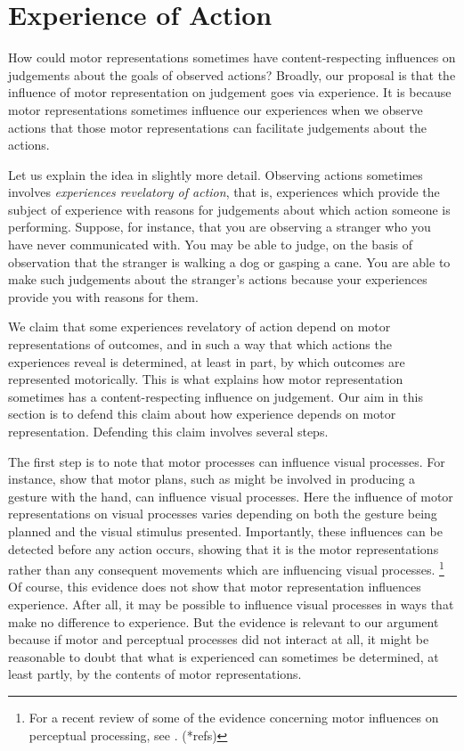 \documentclass[12pt,\papersize]{extarticle}
\begin{document}
\section{Experience of Action}
\label{sec:processes}
How could motor representations sometimes have content-respecting influences on judgements about the goals of observed actions?  Broadly, our proposal is that the influence of motor representation on judgement goes via experience.  It is because motor representations sometimes influence our experiences when we observe actions that those motor representations can facilitate judgements about the actions. 

Let us explain the idea in slightly more detail.  Observing actions sometimes involves \emph{experiences revelatory of action}, that is, experiences which provide the subject of experience with reasons for judgements about which action someone is performing. Suppose, for instance, that you are observing a stranger who you have never communicated with.  You may be able to judge, on the basis of observation that the stranger is walking a dog or gasping a cane.  You are able to make such judgements about the stranger's actions because your experiences provide you with reasons for them.

We claim that some experiences revelatory of action depend on motor representations of outcomes, and in such a way that which actions the experiences reveal is determined, at least in part, by which outcomes are represented motorically. This is what explains how motor representation sometimes has a content-respecting influence on judgement.  Our aim in  this section is to defend this claim about how experience depends on motor representation.  Defending this claim involves several steps.  

The first step is to note that motor processes can influence visual processes.  For instance, \citet{bortoletto:2011_action} show that motor plans, such as might be involved in producing a gesture with the hand, can influence visual processes. Here the influence of motor representations on visual processes varies depending on both the gesture being planned and the visual stimulus presented. Importantly, these influences can be detected before any action occurs, showing that it is the motor representations rather than any consequent movements which are influencing visual processes.%
\footnote{
For a recent review of some of the evidence concerning motor influences on perceptual processing, see \citet{halasz:2012_unconscious}. (*refs)
}  
Of course, this evidence does not show that motor representation influences experience. After all, it may be possible to influence visual processes in ways that make no difference to experience.  But the evidence is relevant to our argument because if motor and perceptual processes did not interact at all, it might be reasonable to doubt that what is experienced can sometimes be determined, at least partly, by the contents of motor representations.
\end{document}
